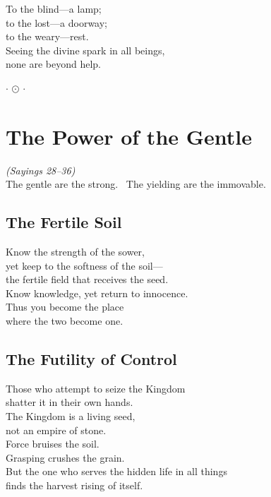 \documentclass[10pt, openright]{book}
\newcommand{\ornament}{
    \vspace{1.5cm}
    \begin{center}
        \large $\cdot$ $\odot$ $\cdot$
    \end{center}
    \vspace{1.5cm}
}
\begin{document}
To the blind—a lamp; \\
to the lost—a doorway; \\
to the weary—rest. \\
Seeing the divine spark in all beings, \\
none are beyond help.

\ornament

\chapter{The Power of the Gentle}
\begin{center}
    \textit{(Sayings 28--36)} \\
    \vspace{0.5cm}
    \small The gentle are the strong. \ The yielding are the immovable.
\end{center}
\vspace{0.5cm}

\section{The Fertile Soil}
Know the strength of the sower, \\
yet keep to the softness of the soil— \\
the fertile field that receives the seed. \\

Know knowledge, yet return to innocence. \\
Thus you become the place \\
where the two become one.

\section{The Futility of Control}
Those who attempt to seize the Kingdom \\
shatter it in their own hands. \\
The Kingdom is a living seed, \\
not an empire of stone. \\

Force bruises the soil. \\
Grasping crushes the grain. \\
But the one who serves the hidden life in all things \\
finds the harvest rising of itself.
\end{document}
